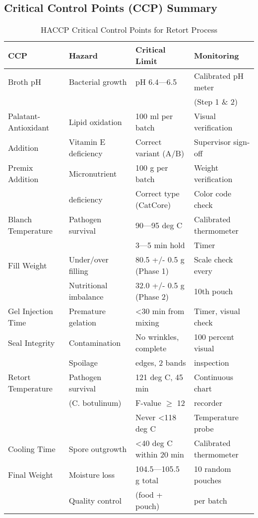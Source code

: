 {%

\subsection*{Critical Control Points (CCP) Summary}

\begin{table}[h]
\centering
\caption{HACCP Critical Control Points for Retort Process}
\label{tab:ccp}
\begin{tabular}{@{}llll@{}}
\toprule
\textbf{CCP} & \textbf{Hazard} & \textbf{Critical Limit} & \textbf{Monitoring} \\
\midrule
Broth pH & Bacterial growth & pH 6.4---6.5 & Calibrated pH meter \\
 & & & (Step 1 \& 2) \\
\midrule
Palatant-Antioxidant & Lipid oxidation & 100 ml per batch & Visual verification \\
Addition & Vitamin E deficiency & Correct variant (A/B) 
& Supervisor sign-off \\
\midrule
Premix Addition & Micronutrient & 100 g per batch & Weight verification \\
 & deficiency & Correct type (CatCore) & Color code check \\
\midrule
Blanch Temperature & Pathogen survival & 90---95 deg C & Calibrated thermometer \\
 & & 3---5 min hold & Timer \\
\midrule
Fill Weight & Under/over filling & 80.5 +/- 0.5 g (Phase 1) & Scale check every \\
 & Nutritional imbalance & 32.0 +/- 0.5 g (Phase 2) & 10th pouch \\
\midrule
Gel Injection Time & Premature gelation & <30 min from mixing & Timer, visual check \\
\midrule
Seal Integrity & Contamination & No wrinkles, complete & 
100 percent visual \\
 & Spoilage & edges, 2 bands & inspection \\
\midrule
Retort Temperature & Pathogen survival & 121 deg C, 45 min & Continuous chart \\
 & (C.
botulinum) & F-value $\ge$ 12 & recorder \\
 & & Never <118 deg C & Temperature probe \\
\midrule
Cooling Time & Spore outgrowth & <40 deg C within 20 min & Calibrated thermometer \\
\midrule
Final Weight & Moisture loss & 104.5---105.5 g total & 10 random pouches \\
 & Quality control & (food + pouch) & per batch \\
\bottomrule
\end{tabular}
\end{table}

}
